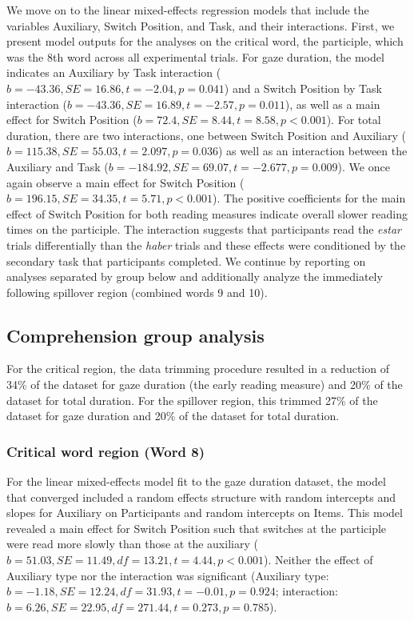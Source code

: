 \documentclass[output=paper,colorlinks,citecolor=brown]{langscibook}
\begin{document}
We move on to the linear mixed-effects regression models that include the variables Auxiliary, Switch Position, and Task, and their interactions. First, we present model outputs for the analyses on the critical word, the participle, which was the 8th word across all experimental trials. For gaze duration, the model indicates an Auxiliary by Task interaction ($b = -43.36, SE = 16.86, t = -2.04, p = 0.041$) and a Switch Position by Task interaction ($b = -43.36, SE = 16.89, t = -2.57, p = 0.011$),  as well as a main effect for Switch Position ($b = 72.4, SE = 8.44, t = 8.58, p < 0.001$). For total duration, there are two interactions, one between Switch Position and Auxiliary ($b = 115.38, SE = 55.03, t = 2.097, p = 0.036$) as well as an interaction between the Auxiliary and Task ($b = -184.92, SE = 69.07, t = -2.677, p = 0.009$). We once again observe a main effect for Switch Position ($b = 196.15, SE = 34.35, t = 5.71, p < 0.001$). The positive coefficients for the main effect of Switch Position for both reading measures indicate overall slower reading times on the participle. The interaction suggests that participants read the \textit{estar} trials differentially than the \textit{haber} trials and these effects were conditioned by the secondary task that participants completed. We continue by reporting on analyses separated by group below and additionally analyze the immediately following spillover region (combined words 9 and 10).

\subsection{Comprehension group analysis}
For the critical region, the data trimming procedure resulted in a reduction of 34\% of the dataset for gaze duration (the early reading measure) and 20\% of the dataset for total duration. For the spillover region, this trimmed 27\% of the dataset for gaze duration and 20\% of the dataset for total duration.

\subsubsection{Critical word region (Word 8)}
For the linear mixed-effects model fit to the gaze duration dataset, the model that converged included a random effects structure with random intercepts and slopes for Auxiliary on Participants and random intercepts on Items. This model revealed a main effect for Switch Position such that switches at the participle were read more slowly than those at the auxiliary ($b = 51.03, SE = 11.49, df = 13.21, t = 4.44, p < 0.001$). Neither the effect of Auxiliary type nor the interaction was significant (Auxiliary type: $b = -1.18, SE = 12.24, df = 31.93, t = -0.01, p = 0.924$; interaction: $b = 6.26, SE = 22.95, df = 271.44, t = 0.273, p = 0.785$).
\end{document}
